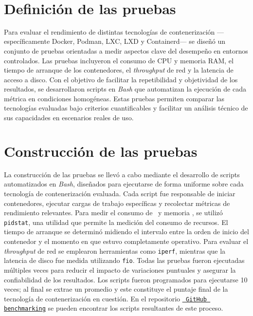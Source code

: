 \label{cap:benchmarking}

\mbox{}\\
\section{Definición de las pruebas}
\noindent
Para evaluar el rendimiento de distintas tecnologías de contenerización —específicamente Docker, Podman, LXC, LXD y Containerd— se diseñó un conjunto de pruebas orientadas a medir aspectos clave del desempeño en entornos controlados. Las pruebas incluyeron el consumo de CPU y memoria RAM, el tiempo de arranque de los contenedores, el \textit{throughput} de red y la latencia de acceso a disco. 
Con el objetivo de facilitar la repetibilidad y objetividad de los resultados, se desarrollaron scripts en \textit{Bash} que automatizan la ejecución de cada métrica en condiciones homogéneas. Estas pruebas permiten comparar las tecnologías evaluadas bajo criterios cuantificables y facilitar un análisis técnico de sus capacidades en escenarios reales de uso.

\section{Construcción de las pruebas}
\noindent
La construcción de las pruebas se llevó a cabo mediante el desarrollo de scripts automatizados en \textit{Bash}, diseñados para ejecutarse de forma uniforme sobre cada tecnología de contenerización evaluada. Cada script fue responsable de iniciar contenedores, ejecutar cargas de trabajo específicas y recolectar métricas de rendimiento relevantes.
Para medir el consumo de \CPU\ y memoria \RAM, se utilizó \texttt{pidstat}, una utilidad que permite la medición del consumo de recursos. El tiempo de arranque se determinó midiendo el intervalo entre la orden de inicio del contenedor y el momento en que estuvo completamente operativo. 
Para evaluar el \textit{throughput} de red se emplearon herramientas como \texttt{iperf}, mientras que la latencia de disco fue medida utilizando \texttt{fio}. Todas las pruebas fueron ejecutadas múltiples veces para reducir el impacto de variaciones puntuales y asegurar la confiabilidad de los resultados. Los scripts fueron programados para ejecutarse 10 veces; al final se extrae un promedio y este constituye el puntaje final de la tecnología de contenerización en cuestión.
En el repositorio \underline{\href{https://github.com/Anubis-1001/benchmark-tecnologias-de-contenerizacion} {\texttt{ GitHub benchmarking}}} se pueden encontrar los scripts resultantes de este proceso.

